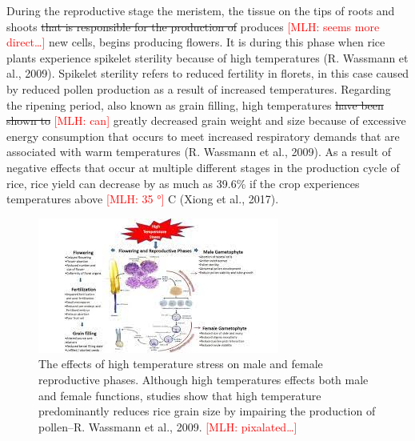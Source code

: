 \documentclass{book}\usepackage{knitr}
\newcommand{\red}[1]{\textcolor{red}{[MLH: #1]}}
\begin{document}
\begin{knitrout}
\begin{kframe}
{ During the reproductive stage the meristem, the tissue on the tips of roots and shoots \st{that is responsible for the production of} produces \red{seems more direct\ldots} new cells, begins producing flowers. It is during this phase when rice plants experience spikelet sterility because of high temperatures (R. Wassmann et al., 2009). Spikelet sterility refers to reduced fertility in florets, in this case caused by reduced pollen production as a result of increased temperatures. Regarding the ripening period, also known as grain filling, high temperatures \st{have been shown to} \red{can} greatly decreased grain weight and size because of excessive energy consumption that occurs to meet increased respiratory demands that are associated with warm temperatures (R. Wassmann et al., 2009). As a result of negative effects that occur at multiple different stages in the production cycle of rice, rice yield can decrease by as much as 39.6\% if the crop experiences temperatures above \red{35 °} C (Xiong et al., 2017).
 
\begin{figure}
\includegraphics[width=\linewidth]{images/myanmar/Image5.jpg}
\caption{The effects of high temperature stress on male and female reproductive phases. Although high temperatures effects both male and female functions, studies show that high temperature predominantly reduces rice grain size by impairing the production of pollen--R. Wassmann et al., 2009. \red{pixalated\ldots}}
\end{figure}

}
\end{kframe}
\end{knitrout}
\end{document}
